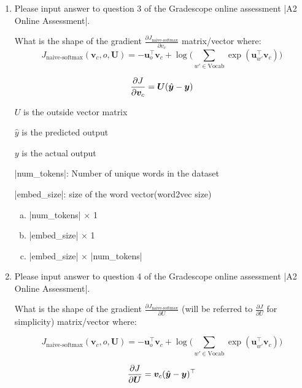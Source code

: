 \begin{enumerate}[1.]

\item {}
Please input answer to question 3 of the Gradescope online assessment |A2 Online Assessment|.

What is the shape of the gradient $\frac{\partial J_\text{naive-softmax}}{\partial v_c}$ matrix/vector where:
\begin{equation*} J_{\text{naive-softmax}}(\bm v_c, o, \bm U) = - \bm u_{o}^\top \bm v_c + \log \bigg( \sum_{w' \in \text{Vocab}} \exp(\bm u_{w'}^\top \bm v_c) \bigg) \end{equation*}

\begin{equation*} {\partial J \over \partial \bm v_c} = \bm U(\hat{\bm y} - \bm y)\end{equation*}

$U$ is the outside vector matrix

$\hat{y}$ is the predicted output

$y$ is the actual output

|num_tokens|: Number of unique words in the dataset

|embed_size|: size of the word vector(word2vec size)

\begin{enumerate}[(a)]
\item |num_tokens| $\times$ 1
\item |embed_size| $\times$ 1
\item |embed_size| $\times$ |num_tokens|
\end{enumerate}


\item {}
Please input answer to question 4 of the Gradescope online assessment |A2 Online Assessment|.

What is the shape of the gradient $\frac{\partial J_\text{naive-softmax}}{\partial U}$ (will be referred to $\frac{\partial J}{\partial U}$ for simplicity) matrix/vector where:

\begin{equation*} J_{\text{naive-softmax}}(\bm v_c, o, \bm U) = - \bm u_{o}^\top \bm v_c + \log \bigg( \sum_{w' \in \text{Vocab}} \exp(\bm u_{w'}^\top \bm v_c) \bigg) \end{equation*}

\begin{equation*} {\partial J \over \partial \bm U } = {\bm v_c} (\hat{\bm y} - \bm y)^\top \end{equation*}


\end{enumerate}
